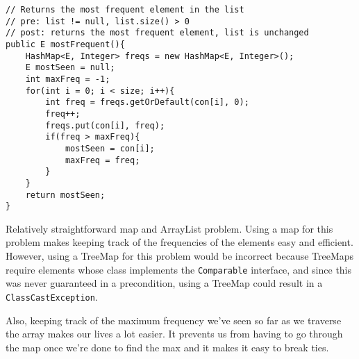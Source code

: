 \documentclass[12pt,letter]{article}
\begin{document}
\clearpage
\begin{verbatim}
// Returns the most frequent element in the list
// pre: list != null, list.size() > 0
// post: returns the most frequent element, list is unchanged
public E mostFrequent(){
    HashMap<E, Integer> freqs = new HashMap<E, Integer>();
    E mostSeen = null;
    int maxFreq = -1;
    for(int i = 0; i < size; i++){
        int freq = freqs.getOrDefault(con[i], 0);
        freq++;
        freqs.put(con[i], freq);
        if(freq > maxFreq){
            mostSeen = con[i];
            maxFreq = freq;
        }
    }
    return mostSeen;
}
\end{verbatim}

Relatively straightforward map and ArrayList problem. Using a map for this problem makes keeping
track of the frequencies of the elements easy and efficient. However, using a TreeMap for this problem would be incorrect because
TreeMaps require elements whose class implements the \texttt{Comparable} interface, and since this was never guaranteed
in a precondition, using a TreeMap could result in a \texttt{ClassCastException}. 

Also, keeping track of the maximum frequency we've seen so far as we traverse the array makes our lives a lot easier. It prevents us from
having to go through the map once we're done to find the max and it makes it easy to break ties.
\end{document}
